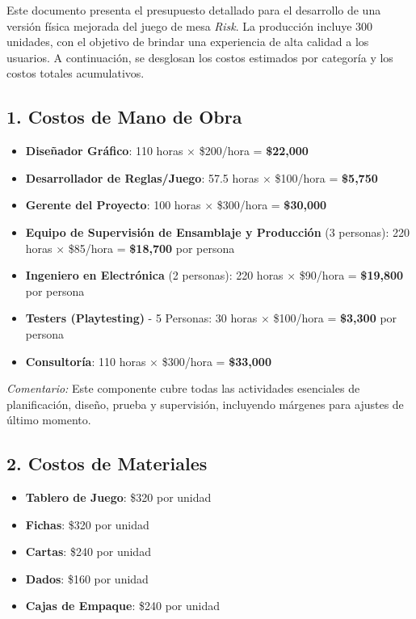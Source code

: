 \documentclass[12pt]{article}
\begin{document}
Este documento presenta el presupuesto detallado para el desarrollo de una versión física mejorada del juego de mesa \textit{Risk}. La producción incluye 300 unidades, con el objetivo de brindar una experiencia de alta calidad a los usuarios. A continuación, se desglosan los costos estimados por categoría y los costos totales acumulativos.

\subsection*{1. Costos de Mano de Obra}
\begin{itemize}
    \item \textbf{Diseñador Gráfico}: 110 horas $\times$ \$200/hora = \textbf{\$22,000}
    \item \textbf{Desarrollador de Reglas/Juego}: 57.5 horas $\times$ \$100/hora = \textbf{\$5,750}
    \item \textbf{Gerente del Proyecto}: 100 horas $\times$ \$300/hora = \textbf{\$30,000}
    \item \textbf{Equipo de Supervisión de Ensamblaje y Producción} (3 personas): 220 horas $\times$ \$85/hora = \textbf{\$18,700} por persona
    \item \textbf{Ingeniero en Electrónica} (2 personas): 220 horas $\times$ \$90/hora = \textbf{\$19,800} por persona
    \item \textbf{Testers (Playtesting)} - 5 Personas: 30 horas $\times$ \$100/hora = \textbf{\$3,300} por persona
    \item \textbf{Consultoría}: 110 horas $\times$ \$300/hora = \textbf{\$33,000}
\end{itemize}

\textit{Comentario:} Este componente cubre todas las actividades esenciales de planificación, diseño, prueba y supervisión, incluyendo márgenes para ajustes de último momento.

\subsection*{2. Costos de Materiales}
\begin{itemize}
    \item \textbf{Tablero de Juego}: \$320 por unidad
    \item \textbf{Fichas}: \$320 por unidad
    \item \textbf{Cartas}: \$240 por unidad
    \item \textbf{Dados}: \$160 por unidad
    \item \textbf{Cajas de Empaque}: \$240 por unidad
\end{itemize}
\end{document}
